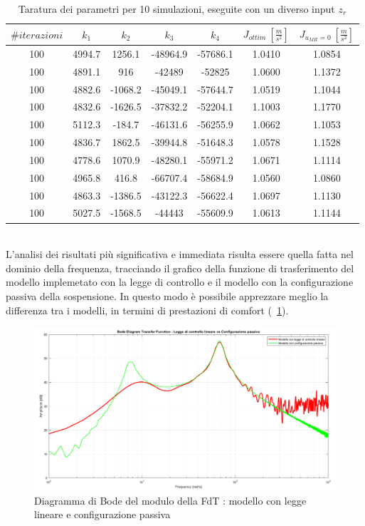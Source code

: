 \begin{table}[hbt]
	\centering
	\begin{tabular}{|c||c|c|c|c||c|c|}
		\hline
		$\# iterazioni$ & \textbf{$k_1$} & \textbf{$k_2$} & \textbf{$k_3$} & \textbf{$k_4$} & \textbf{$J_{ottim} \ [\frac{m}{s^2}]$} & \textbf{$J_{u_{MR} = 0} \ [\frac{m}{s^2}]$}\\
		\hline
		\hline 100 & 4994.7 & 1256.1 & -48964.9 & -57686.1 & 1.0410 & 1.0854\\
		\hline 100 & 4891.1 & 916 & -42489 & -52825 & 1.0600 & 1.1372\\
		\hline 100 & 4882.6 & -1068.2 & -45049.1 & -57644.7 & 1.0519 & 1.1044\\
		\hline 100 & 4832.6 & -1626.5 & -37832.2 & -52204.1 & 1.1003 & 1.1770\\
		\hline 100 & 5112.3 & -184.7 & -46131.6 & -56255.9 & 1.0662 & 1.1053\\
		\hline 100 & 4836.7 & 1862.5 & -39944.8 & -51648.3 & 1.0578 & 1.1528\\
		\hline 100 & 4778.6 & 1070.9 & -48280.1 & -55971.2 & 1.0671 & 1.1114\\
		\hline 100 & 4965.8 & 416.8 & -66707.4 & -58684.9 & 1.0560 & 1.0860\\
		\hline 100 & 4863.3 & -1386.5 & -43122.3 & -56622.4 & 1.0697 & 1.1130\\
		\hline 100 & 5027.5 & -1568.5 & -44443 & -55609.9 & 1.0613 & 1.1144\\		
		\hline
	\end{tabular}
	\caption{Taratura dei parametri per 10 simulazioni, eseguite con un diverso input $z_r$}
	\label{risultatileggelin}
\end{table}\\
L'analisi dei risultati più significativa e immediata risulta essere quella fatta nel dominio della frequenza, tracciando il grafico della funzione di trasferimento del modello implemetato con la legge di controllo e il modello con la configurazione passiva della sospensione. In questo modo è possibile apprezzare meglio la differenza tra i modelli, in termini di prestazioni di comfort (\figurename \ \ref{fig:confronto}).
\begin{figure}[htb]
	\centering
	\includegraphics[scale=0.4]{figure/confrontoPas-Lin.png}
	\caption{Diagramma di Bode del modulo della FdT : modello con legge lineare e configurazione passiva}
	\label{fig:confronto}
\end{figure}\\
